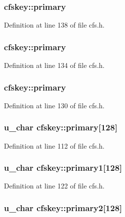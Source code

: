 \subsubsection{ {\bf cfskey::primary}}\label{structcfskey_o18}




Definition at line 138 of file cfs.h.
\subsubsection{ {\bf cfskey::primary}}\label{structcfskey_o15}




Definition at line 134 of file cfs.h.
\subsubsection{ {\bf cfskey::primary}}\label{structcfskey_o12}




Definition at line 130 of file cfs.h.
\subsubsection{\setlength{\rightskip}{0pt plus 5cm}u\_\-char {\bf cfskey::primary}[128]}\label{structcfskey_o1}




Definition at line 112 of file cfs.h.
\subsubsection{\setlength{\rightskip}{0pt plus 5cm}u\_\-char {\bf cfskey::primary1}[128]}\label{structcfskey_o4}




Definition at line 122 of file cfs.h.
\subsubsection{\setlength{\rightskip}{0pt plus 5cm}u\_\-char {\bf cfskey::primary2}[128]}\label{structcfskey_o5}




